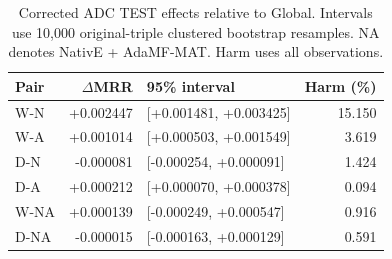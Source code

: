 \begin{table}[htbp]
\centering\small
\caption{Corrected ADC TEST effects relative to Global. Intervals use 10,000 original-triple clustered bootstrap resamples. NA denotes NativE + AdaMF-MAT. Harm uses all observations.}
\label{tab:rerun-effects}
\begin{tabular}{lrlr}
\toprule
Pair & $\Delta$MRR & 95\% interval & Harm (\%)\\
\midrule
W-N & +0.002447 & [+0.001481, +0.003425] & 15.150\\
W-A & +0.001014 & [+0.000503, +0.001549] & 3.619\\
D-N & -0.000081 & [-0.000254, +0.000091] & 1.424\\
D-A & +0.000212 & [+0.000070, +0.000378] & 0.094\\
W-NA & +0.000139 & [-0.000249, +0.000547] & 0.916\\
D-NA & -0.000015 & [-0.000163, +0.000129] & 0.591\\
\bottomrule
\end{tabular}
\end{table}
